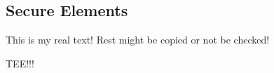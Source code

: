 \subsection{Secure Elements}\label{subsection:evaluation-external-secure}
This is my real text! Rest might be copied or not be checked!

TEE!!!
